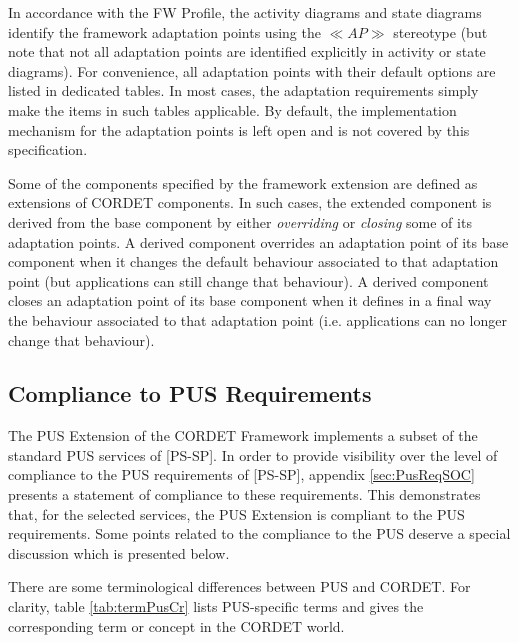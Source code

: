 \documentclass{pnp_article}
\begin{document}
In accordance with the FW Profile, the activity diagrams and state diagrams identify the framework adaptation points using the $\ll AP \gg$ stereotype (but note that not all adaptation points are identified explicitly in activity or state diagrams). 
For convenience, all adaptation points with their default options are listed in dedicated tables. 
In most cases, the adaptation requirements simply make the items in such tables applicable. By default, the implementation mechanism for the adaptation points is left open and is not covered by this specification. 

Some of the components specified by the framework extension are defined as extensions of CORDET components. In such cases, the extended component is derived from the base component by either \textit{overriding} or \textit{closing} some of its adaptation points. 
A derived component overrides an adaptation point of its base component when it changes the default behaviour associated to that adaptation point (but applications can still change that behaviour). 
A derived component closes an adaptation point of its base component when it defines in a final way the behaviour associated to that adaptation point (i.e. applications can no longer change that behaviour).

\subsection{Compliance to PUS Requirements}\label{sec:ComplianceToPus}
The PUS Extension of the CORDET Framework implements a subset of the standard PUS services of [PS-SP]. In order to provide visibility over the level of compliance to the PUS requirements of [PS-SP], appendix \ref{sec:PusReqSOC} presents a statement of compliance to these requirements. This demonstrates that, for the selected services, the PUS Extension is compliant to the PUS requirements. Some points related to the compliance to the PUS deserve a special discussion which is presented below. 

There are some terminological differences between PUS and CORDET. For clarity, table \ref{tab:termPusCr} lists PUS-specific terms and gives the corresponding term or concept in the CORDET world. 
\end{document}

